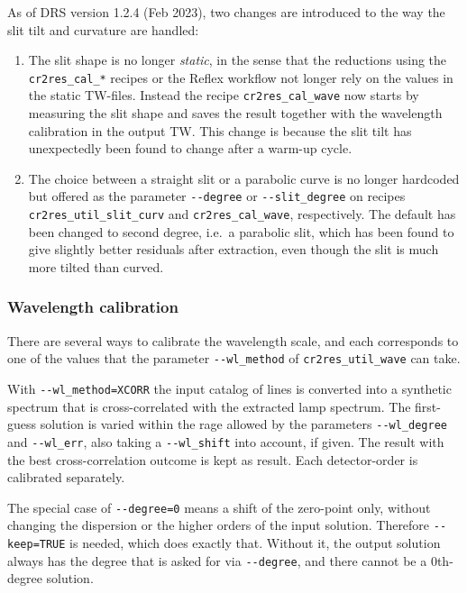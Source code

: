As of DRS version 1.2.4 (Feb 2023), two changes are introduced to the way the
slit tilt and curvature are handled:

\begin{enumerate}
    \item The slit shape is no longer \emph{static}, in the sense that the
    reductions using the \verb!cr2res_cal_*! recipes or the Reflex workflow not
    longer rely on the values in the static TW-files. Instead the recipe
    \verb!cr2res_cal_wave! now starts by measuring the slit shape and saves the
    result together with the wavelength calibration in the output TW. This
    change is because the slit tilt has unexpectedly been found to change after
    a warm-up cycle.
    \item The choice between a straight slit or a parabolic curve is no longer
    hardcoded but offered as the parameter \verb!--degree! or
    \verb!--slit_degree! on recipes \verb!cr2res_util_slit_curv! and
    \verb!cr2res_cal_wave!, respectively. The default has been changed to second
    degree, i.e.~a parabolic slit, which has been found to give slightly better
    residuals after extraction, even though the slit is much more tilted than
    curved.
\end{enumerate}

\subsubsection{Wavelength calibration}

There are several ways to calibrate the wavelength scale, and each corresponds
to one of the values that the parameter \texttt{-{}-wl\_method} of
\texttt{cr2res\_util\_wave} can take.

With \texttt{-{}-wl\_method=XCORR} the input catalog of lines is converted
into a synthetic spectrum that is cross-correlated with the extracted lamp
spectrum. The first-guess solution is varied within the rage allowed by the parameters \verb!--wl_degree! and \verb!--wl_err!, also taking a \verb!--wl_shift! into account, if given. The result with the best cross-correlation outcome is kept as result.
Each detector-order is calibrated separately.

The special case of \verb!--degree=0! means a shift of the zero-point only, without changing the dispersion or the higher orders of the input solution. Therefore \verb!--keep=TRUE! is needed, which does exactly that. Without it, the output solution always has the degree that is asked for via \verb!--degree!, and there cannot be a $0$th-degree solution.

